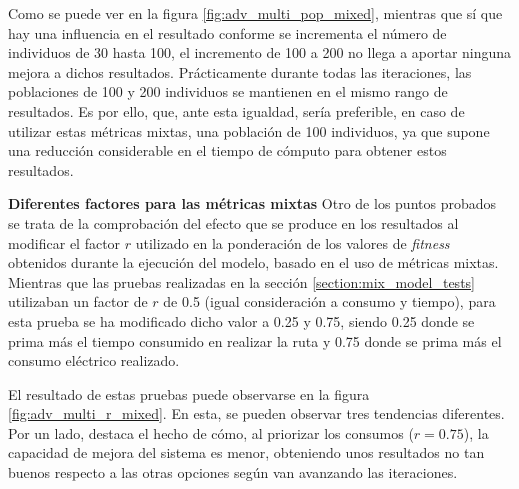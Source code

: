 \documentclass[11pt,spanish,listoffigures,listoftables]{tfgetsinf}
\begin{document}
Como se puede ver en la figura \ref{fig:adv_multi_pop_mixed}, mientras que sí que hay una influencia en el resultado conforme se incrementa el número de individuos de 30 hasta 100, el incremento de 100 a 200 no llega a aportar ninguna mejora a dichos resultados. Prácticamente durante todas las iteraciones, las poblaciones de 100 y 200 individuos se mantienen en el mismo rango de resultados. Es por ello, que, ante esta igualdad, sería preferible, en caso de utilizar estas métricas mixtas, una población de 100 individuos, ya que supone una reducción considerable en el tiempo de cómputo para obtener estos resultados.\newline

\textbf{Diferentes factores para las métricas mixtas}\newline
Otro de los puntos probados se trata de la comprobación del efecto que se produce en los resultados al modificar el factor $r$ utilizado en la ponderación de los valores de \textit{fitness} obtenidos durante la ejecución del modelo, basado en el uso de métricas mixtas. Mientras que las pruebas realizadas en la sección \ref{section:mix_model_tests} utilizaban un factor de $r$ de 0.5 (igual consideración a consumo y tiempo), para esta prueba se ha modificado dicho valor a 0.25 y 0.75, siendo 0.25 donde se prima más el tiempo consumido en realizar la ruta y 0.75 donde se prima más el consumo eléctrico realizado.

El resultado de estas pruebas puede observarse en la figura \ref{fig:adv_multi_r_mixed}. En esta, se pueden observar tres tendencias diferentes. Por un lado, destaca el hecho de cómo, al priorizar los consumos ($r=0.75$), la capacidad de mejora del sistema es menor, obteniendo unos resultados no tan buenos respecto a las otras opciones según van avanzando las iteraciones.
\end{document}
